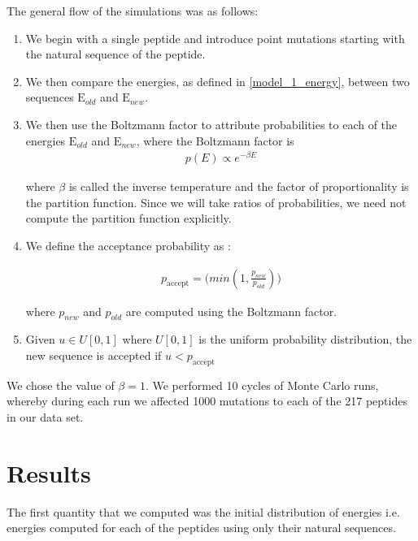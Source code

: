 \documentclass[a4paper, 12pt]{article}
\begin{document}
	The general flow of the simulations was as follows:

	\begin{enumerate}
	\item 
	We begin with a single peptide and introduce point mutations starting with the natural sequence of the peptide. 
	\item 
	We then compare the energies, as defined in \eqref{model_1_energy}, between two sequences $\mathrm{E}_{old}$ and $\mathrm{E}_{new}$. 
	\item 
	We then use the Boltzmann factor to attribute probabilities to each of the energies  $\mathrm{E}_{old}$ and $\mathrm{E}_{new}$, where the Boltzmann factor is 
	\begin{align}
	\label{boltz}
	p(E) \propto e^{-\beta E}
	\end{align}

	where $\beta$ is called the inverse temperature and the factor of proportionality is the partition function. Since we will take ratios of probabilities, we need not compute the partition function explicitly. 

	\item 
	We define the acceptance probability as :

	\begin{align}
	\label{prob_acceptance}
	p_{\mathrm{accept}} = \mathrm(min(1, \frac{p_{new}}{p_{old}}))
	\end{align}

	where $p_{new}$ and $p_{old}$ are computed using the Boltzmann factor.

	\item 

	Given $u \in U[0,1]$ where $U[0,1]$ is the uniform probability distribution, the new sequence is accepted if $ u < p_{\mathrm{accept}}$
	\end{enumerate}

	We chose the value of $\beta=1$. We performed 10 cycles of Monte Carlo runs, whereby during each run we affected 1000 mutations to each of the 217 peptides in our data set. 

 	\section{Results}

 	The first quantity that we computed was the initial distribution of energies i.e. energies computed for each of the peptides using only their natural sequences. 
\end{document}
